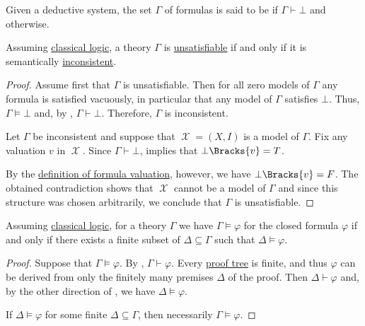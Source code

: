 \begin{definition}\label{def:first_order_theory_consistency}
  Given a deductive system, the set \( \Gamma \) of formulas is said to be  if \( \Gamma \vdash \bot \) and  otherwise.
\end{definition}

\begin{proposition}\label{thm:formulas_unsatisfiable_iff_inconsistent}
   Assuming \hyperref[def:classical_logic]{classical logic}, a theory \( \Gamma \) is \hyperref[def:propositional_semantics/satisfiability]{unsatisfiable} if and only if it is semantically \hyperref[def:first_order_theory_consistency]{inconsistent}.
\end{proposition}
\begin{proof}
  \SufficiencySubProof Assume first that \( \Gamma \) is unsatisfiable. Then for all zero models of \( \Gamma \) any formula is satisfied vacuously, in particular that any model of \( \Gamma \) satisfies \( \bot \). Thus, \( \Gamma \vDash \bot \) and, by , \( \Gamma \vdash \bot \). Therefore, \( \Gamma \) is inconsistent.

  \NecessitySubProof Let \( \Gamma \) be inconsistent and suppose that \( \mscrX = (X, I) \) is a model of \( \Gamma \). Fix any valuation \( v \) in \( \mscrX \). Since \( \Gamma \vdash \bot \),  implies that \( \bot\Bracks{v} = T \).

  By the \hyperref[def:first_order_valuation/formula_valuation]{definition of formula valuation}, however, we have \( \bot\Bracks{v} = F \). The obtained contradiction shows that \( \mscrX \) cannot be a model of \( \Gamma \) and since this structure was chosen arbitrarily, we conclude that \( \Gamma \) is unsatisfiable.
\end{proof}

\begin{theorem}\label{thm:first_order_compactness_theorem}
  Assuming \hyperref[def:classical_logic]{classical logic}, for a theory \( \Gamma \) we have \( \Gamma \vDash \varphi \) for the closed formula \( \varphi \) if and only if there exists a finite subset of \( \Delta \subseteq \Gamma \) such that \( \Delta \vDash \varphi \).
\end{theorem}
\begin{proof}
  \SufficiencySubProof Suppose that \( \Gamma \vDash \varphi \). By , \( \Gamma \vdash \varphi \). Every \hyperref[def:proof_tree]{proof tree} is finite, and thus \( \varphi \) can be derived from only the finitely many premises \( \Delta \) of the proof. Then \( \Delta \vdash \varphi \) and, by the other direction of , we have \( \Delta \vDash \varphi \).

  \NecessitySubProof If \( \Delta \vDash \varphi \) for some finite \( \Delta \subseteq \Gamma \), then necessarily \( \Gamma \vDash \varphi \).
\end{proof}

